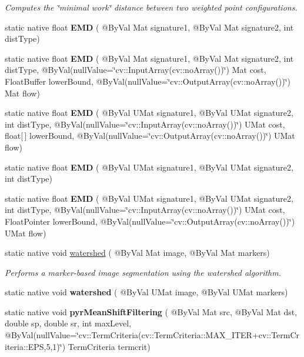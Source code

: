 \begin{DoxyCompactItemize}
\begin{DoxyCompactList}\small\item\em Computes the \char`\"{}minimal work\char`\"{} distance between two weighted point configurations. \end{DoxyCompactList}\item 
static native float {\bfseries E\+MD} ( @By\+Val Mat signature1, @By\+Val Mat signature2, int dist\+Type)
\item 
static native float {\bfseries E\+MD} ( @By\+Val Mat signature1, @By\+Val Mat signature2, int dist\+Type, @By\+Val(null\+Value=\char`\"{}cv\+::\+Input\+Array(cv\+::no\+Array())\char`\"{}) Mat cost, Float\+Buffer lower\+Bound, @By\+Val(null\+Value=\char`\"{}cv\+::\+Output\+Array(cv\+::no\+Array())\char`\"{}) Mat flow)
\item 
static native float {\bfseries E\+MD} ( @By\+Val U\+Mat signature1, @By\+Val U\+Mat signature2, int dist\+Type, @By\+Val(null\+Value=\char`\"{}cv\+::\+Input\+Array(cv\+::no\+Array())\char`\"{}) U\+Mat cost, float\mbox{[}$\,$\mbox{]} lower\+Bound, @By\+Val(null\+Value=\char`\"{}cv\+::\+Output\+Array(cv\+::no\+Array())\char`\"{}) U\+Mat flow)
\item 
static native float {\bfseries E\+MD} ( @By\+Val U\+Mat signature1, @By\+Val U\+Mat signature2, int dist\+Type)
\item 
static native float {\bfseries E\+MD} ( @By\+Val U\+Mat signature1, @By\+Val U\+Mat signature2, int dist\+Type, @By\+Val(null\+Value=\char`\"{}cv\+::\+Input\+Array(cv\+::no\+Array())\char`\"{}) U\+Mat cost, Float\+Pointer lower\+Bound, @By\+Val(null\+Value=\char`\"{}cv\+::\+Output\+Array(cv\+::no\+Array())\char`\"{}) U\+Mat flow)
\item 
static native void \hyperlink{group__imgproc__misc_ga997b28508969435b04cb1bcb8ebc0841}{watershed} ( @By\+Val Mat image, @By\+Val Mat markers)
\begin{DoxyCompactList}\small\item\em Performs a marker-\/based image segmentation using the watershed algorithm. \end{DoxyCompactList}\item 
static native void {\bfseries watershed} ( @By\+Val U\+Mat image, @By\+Val U\+Mat markers)
\item 
static native void {\bfseries pyr\+Mean\+Shift\+Filtering} ( @By\+Val Mat src, @By\+Val Mat dst, double sp, double sr, int max\+Level, @By\+Val(null\+Value=\char`\"{}cv\+::\+Term\+Criteria(cv\+::\+Term\+Criteria\+::\+M\+A\+X\+\_\+\+I\+T\+ER+cv\+::\+Term\+Criteria\+::\+E\+PS,5,1)\char`\"{}) Term\+Criteria termcrit)

\end{DoxyCompactItemize}
